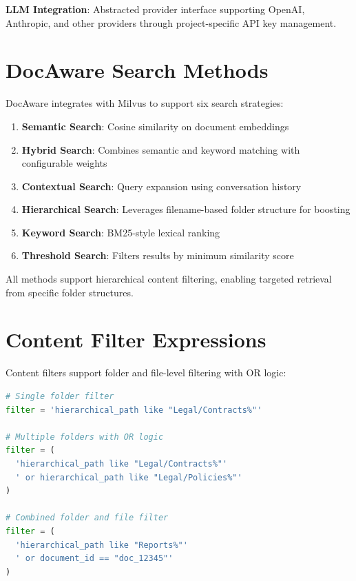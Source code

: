 \documentclass[11pt]{article}
\begin{document}
\textbf{LLM Integration}: Abstracted provider interface supporting OpenAI, Anthropic, and other providers through project-specific API key management.


\section{DocAware Search Methods}
\label{app:search-methods}

DocAware integrates with Milvus to support six search strategies:

\begin{enumerate}
    \item \textbf{Semantic Search}: Cosine similarity on document embeddings
    \item \textbf{Hybrid Search}: Combines semantic and keyword matching with configurable weights
    \item \textbf{Contextual Search}: Query expansion using conversation history
    \item \textbf{Hierarchical Search}: Leverages filename-based folder structure for boosting
    \item \textbf{Keyword Search}: BM25-style lexical ranking
    \item \textbf{Threshold Search}: Filters results by minimum similarity score
\end{enumerate}

All methods support hierarchical content filtering, enabling targeted retrieval from specific folder structures.


\section{Content Filter Expressions}
\label{app:content-filter}

Content filters support folder and file-level filtering with OR logic:

\begin{lstlisting}[language=Python,caption={Content filter expression examples}]
# Single folder filter
filter = 'hierarchical_path like "Legal/Contracts%"'

# Multiple folders with OR logic
filter = (
  'hierarchical_path like "Legal/Contracts%"'
  ' or hierarchical_path like "Legal/Policies%"'
)

# Combined folder and file filter
filter = (
  'hierarchical_path like "Reports%"'
  ' or document_id == "doc_12345"'
)
\end{lstlisting}
\end{document}
